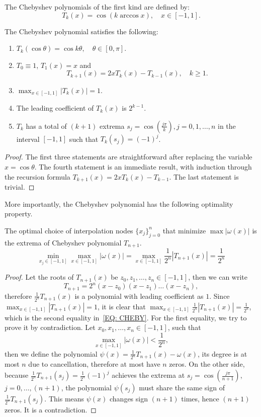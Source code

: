 \begin{definition}
    The Chebyshev polynomials of the first kind are defined by: 
    $$T_k(x) = \cos (k\arccos x),\quad x\in[-1,1].$$
\end{definition}
\begin{theorem}
\label{Thm: 2-Che-Pro}
    The Chebyshev polynomial satisfies the following: 
    \begin{enumerate}
        \item $T_k(\cos\theta) = \cos k\theta, \quad \theta\in [0, \pi]$.
        \item $T_0 \equiv 1$, $T_1(x) = x$ and 
        $$T_{k+1}(x) = 2 x T_{k}(x) - T_{k-1}(x), \quad k\ge 1.$$
        \item $\max_{x\in[-1,1]} |T_k(x)| = 1$.
        \item The leading coefficient of $T_k(x)$ is $2^{k-1}$.
        \item $T_k$ has a total of $(k+1)$ extrema $s_j = \cos(\frac{j\pi}{k}), j = 0, 1,\dots, n$ in the interval $[-1,1]$ such that $T_k(s_j) = (-1)^j$.
    \end{enumerate}
\end{theorem}
\begin{proof}
    The first three statements are straightforward after replacing the variable $x = \cos\theta$. The fourth statement is an immediate result, with induction through the recursion formula 
    $T_{k+1}(x) = 2 x T_k(x) - T_{k-1}$. The last statement is trivial.
\end{proof}
More importantly, the Chebyshev polynomial has the following optimality property. 
\begin{theorem}
\label{Thm: 2-Che-opt}
    The optimal choice of interpolation nodes $\{x_j\}_{j=0}^{n}$ that minimize $\max |\omega(x)|$ is the extrema of Chebyshev polynomial $T_{{n+1}}$.
    \begin{equation}\label{EQ: CHEBY}
        \min_{x_j\in[-1,1]} \max_{x\in[-1,1]} |\omega(x)| =   \max_{x\in[-1,1]} \frac{1}{2^n}|T_{n+1}(x)|  = \frac{1}{2^n}
    \end{equation}
\end{theorem}
\begin{proof}
    Let the roots of $T_{n+1}(x)$ be $z_0, z_1, \dots, z_{n}\in [-1, 1]$, then we can write 
    $$T_{n+1} = 2^{n}(x - z_0)(x-z_1)\dots (x - z_{n}),$$
    therefore $\frac{1}{2^n} T_{n+1}(x)$ is a polynomial with leading coefficient as $1$. Since $\max_{x\in[-1,1]} |T_{n+1}(x)| = 1$, it is clear that $\max_{x\in [-1,1]} \frac{1}{2^n}|T_{n+1}(x)| = \frac{1}{2^n}$, which is the second equality in~\eqref{EQ: CHEBY}. For the first equality, we try to prove it by contradiction. Let $x_0, x_1, \dots, x_n\in [-1, 1]$, such that 
    $$\max_{x\in[-1,1]}|\omega(x)| < \frac{1}{2^n},$$
    then we define the polynomial $\psi(x) = \frac{1}{2^n}T_{n+1}(x)- \omega(x)$, its degree is at most $n$ due to cancellation, therefore at most have $n$ zeros. On the other side, because $\frac{1}{2^n}T_{n+1}(s_j) = \frac{1}{2^n}(-1)^j$ achieves the extrema at $s_j = \cos(\frac{j\pi}{n+1})$, $j=0,\dots, (n+1)$, the polynomial $\psi(s_j)$ must share the same sign of $\frac{1}{2^n}T_{n+1}(s_j)$. This means $\psi(x)$ changes sign $(n+1)$ times, hence $(n+1)$ zeros. It is a contradiction.
\end{proof}
